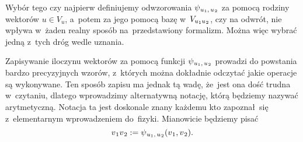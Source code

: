 \documentclass[a4paper,11pt]{article}
\numberwithin{equation}{section}
\begin{document}
Wybór tego czy najpierw definiujemy odwzorowania
$\psi_{ \hspace{0.05em} u_{ 1 }, \, u_{ \hspace{0.05em} 2 } }$ za pomocą rodziny wektorów
$u \in V_{ u }$, a~potem za jego pomocą bazę
w~$V_{ u_{ 1 } u_{ \hspace{0.05em} 2 } }$, czy na odwrót, nie wpływa w~żaden
realny sposób na~przedstawiony formalizm. Można więc wybrać jedną z~tych
dróg wedle uznania.

Zapisywanie iloczynu wektorów za pomocą funkcji
$\psi_{ \hspace{0.05em} u_{ 1 }, \, u_{ \hspace{0.05em} 2 } }$ prowadzi do powstania
bardzo precyzyjnych wzorów, z~których można dokładnie odczytać jakie
operacje są wykonywane. Ten sposób zapisu ma jednak tą wadę, że~jest ona
dość trudna w~czytaniu, dlatego wprowadzimy alternatywną notację, którą
będziemy nazywać arytmetyczną. Notacja ta jest doskonale znany każdemu kto
zapoznał~się z~elementarnym wprowadzeniem do~fizyki. Mianowicie będziemy
pisać
\begin{equation}
  \label{eq:Mechanika-Rozwazania-ogolne-14}
  v_{ \hspace{0.05em} 1 } v_{ \hspace{0.07em} 2 } :=
  \psi_{ \hspace{0.05em} u_{ 1 }, \, u_{ \hspace{0.05em} 2 } }(
  v_{ \hspace{0.05em} 1 }, v_{ \hspace{0.07em} 2 } ).
\end{equation}
\end{document}
